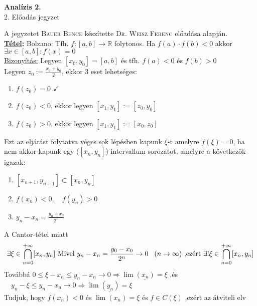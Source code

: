 \documentclass[a4paper,11pt]{article}
\begin{document}
\def\biz{\normalsize{\textbf{\underline{Bizonyítás:} }\hspace*{0.3cm}}}
\def\tetel{\large\textbf{Tétel: }}
\def\defi{\normalsize\textbf{Definíció: }}
\def\Z{\mathbb{Z}}
\def\R{\mathbb{R}}
\def\N{\mathbb{N}}
\def\biz{\normalsize{\underline{Bizonyítás:} }\hspace*{0.5cm}}
\def\tetel{\normalsize \textbf{\underline{Tétel}: }}
\def\bizva{\quad\blacksquare}
\begin{center}
	{\LARGE\textbf{Analízis 2.}}\\[0.2cm]
	
	{\Large 2. Előadás jegyzet}\\[1cm]	
\end{center}
{\small A jegyzetet \textsc{Bauer Bence} készítette \textsc{Dr. Weisz Ferenc} előadása alapján.}\\[0.2cm]
\tetel Bolzano: Tfh. $f: [a,b] \to \R$ folytonos. Ha $f(a)\cdot f(b) < 0$ akkor
$\exists x \in [a,b]: f(x) = 0$\\[0.1cm]
\biz Legyen $ [x_0,y_0] = [a,b] $ és tfh. $f(a) < 0$ és $f(b) > 0 $\\[0.1cm] Legyen
$z_0 := \frac{x_0+y_0}{2}$, ekkor 3 eset lehetséges: 
\begin{enumerate}
	\item $f(z_0) = 0$ $\checkmark$
	\item $f(z_0) < 0$, ekkor legyen $[x_1,y_1] := [z_0,y_0]$
	\item $f(z_0) > 0$, ekkor legyen $[x_1,y_1] := [x_0,z_0]$
\end{enumerate}
Ezt az eljárást folytatva véges sok lépésben kapunk $\xi$-t amelyre $f(\xi) = 0$,
ha nem akkor kapunk egy ($[x_n,y_n]$) intervallum sorozatot, amelyre a következők
igazak:
\begin{enumerate}
	\item $[x_{n+1},y_{n+1}]\subset[x_n,y_n]$
	\item $f(x_n) < 0,\quad f(y_n) > 0$
	\item $y_n - x_n = \frac{y_0-x_0}{2^n}$
\end{enumerate}
A Cantor-tétel miatt \[ \exists\xi\in\bigcap_{n=0}^{+\infty}[x_n,y_n]\text{ Mivel }
y_n-x_n=\frac{y_0-x_0}{2^n}\to0\hspace*{0.3cm}(n\to\infty)\text{ ,ezért  }\exists!
\xi\in\bigcap_{n=0}^{+\infty}[x_n,y_n] \]
Továbbá $0\leq\xi-x_n\leq y_n-x_n\to0\Rightarrow\underline{\lim(x_n)=\xi}$ ,és
$\quad y_n-\xi\leq y_n-x_n\to0\Rightarrow\underline{\lim(y_n)=\xi}$\\[0.2cm]
Tudjuk, hogy $f(x_n)<0$ és $\lim(x_n)=\xi$ és $f\in C(\xi)$ ,ezért az átviteli elv
\end{document}
